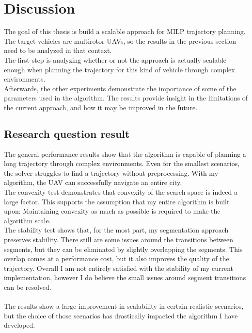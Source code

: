 \newpage


\chapter{Discussion}
The goal of this thesis is build a scalable approach for MILP trajectory planning. The target vehicles are multirotor UAVs, so the results in the previous section need to be analyzed in that context. \\
The first step is analyzing whether or not the approach is actually scalable enough when planning the trajectory for this kind of vehicle through complex environments.\\
Afterwards, the other experiments demonstrate the importance of some of the parameters used in the algorithm. The results provide insight in the limitations of the current approach, and how it may be improved in the future.

\section{Research question result}


The general performance results show that the algorithm is capable of planning a long trajectory through complex environments. Even for the smallest scenarios, the solver struggles to find a trajectory without preprocessing. With my algorithm, the UAV can successfully navigate an entire city. \\
The convexity test demonstrates that convexity of the search space is indeed a large factor. This supports the assumption that my entire algorithm is built upon: Maintaining convexity as much as possible is required to make the algorithm scale. \\
The stability test shows that, for the most part, my segmentation approach preserves stability. There still are some issues around the transitions between segments, but they can be eliminated by slightly overlapping the segments. This overlap comes at a performance cost, but it also improves the quality of the trajectory. Overall I am not entirely satisfied with the stability of my current implementation, however I do believe the small issues around segment transitions can be resolved. \\\\

The results show a large improvement in scalability in certain realistic scenarios, but the choice of those scenarios has drastically impacted the algorithm I have developed.\\


